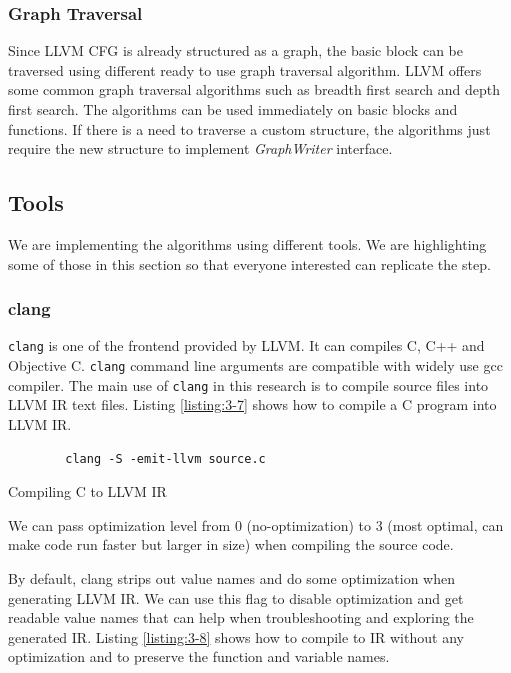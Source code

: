 \subsubsection{Graph Traversal}

Since LLVM CFG is already structured as a graph, the basic block can be traversed using different ready to use graph traversal algorithm. LLVM offers some common graph traversal algorithms such as breadth first search and depth first search. The algorithms can be used immediately on basic blocks and functions. If there is a need to traverse a custom structure, the algorithms just require the new structure to implement \emph{GraphWriter} interface.

\subsection{Tools}

We are implementing the algorithms using different tools. We are highlighting some of those in this section so that everyone interested can replicate the step.

\subsubsection{clang}

\texttt{clang} is one of the frontend provided by LLVM. It can compiles C, C++ and Objective C. \texttt{clang} command line arguments are compatible with widely use gcc compiler. The main use of \texttt{clang} in this research is to compile source files into LLVM IR text files. Listing \ref{listing:3-7} shows how to compile a C program into LLVM IR. 

\begin{listing}
    \begin{verbatim}
        clang -S -emit-llvm source.c
    \end{verbatim}
    \caption{Compiling C to LLVM IR}    
    \label{listing:3-7}
\end{listing}
    
We can pass optimization level from 0 (no-optimization) to 3 (most optimal, can make code run faster but larger in size) when compiling the source code.

By default, clang strips out value names and do some optimization when generating LLVM IR. We can use this flag to disable optimization and get readable value names that can help when troubleshooting and exploring the generated IR. Listing \ref{listing:3-8} shows how to compile to IR without any optimization and to preserve the function and variable names.

